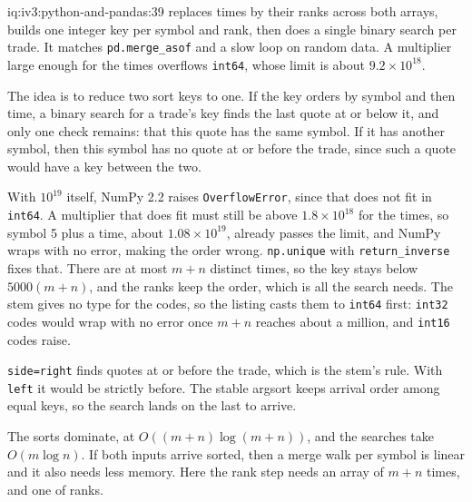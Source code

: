 \begin{solution}{iq:iv3:python-and-pandas:39}
 replaces times by their ranks across both arrays, builds one integer key per symbol and rank, then does a single binary search per trade. It matches \texttt{pd.merge\_asof} and a slow loop on random data. A multiplier large enough for the times overflows \texttt{int64}, whose limit is about $9.2 \times 10^{18}$.
\label{lst:iv3:pp:asofnp}

The idea is to reduce two sort keys to one. If the key orders by symbol and then time, a binary search for a trade's key finds the last quote at or below it, and only one check remains: that this quote has the same symbol. If it has another symbol, then this symbol has no quote at or before the trade, since such a quote would have a key between the two.

With $10^{19}$ itself, NumPy 2.2 raises \texttt{OverflowError}, since that does not fit in \texttt{int64}. A multiplier that does fit must still be above $1.8 \times 10^{18}$ for the times, so symbol 5 plus a time, about $1.08 \times 10^{19}$, already passes the limit, and NumPy wraps with no error, making the order wrong. \texttt{np.unique} with \texttt{return\_inverse} fixes that. There are at most $m + n$ distinct times, so the key stays below $5000 (m + n)$, and the ranks keep the order, which is all the search needs. The stem gives no type for the codes, so the listing casts them to \texttt{int64} first: \texttt{int32} codes would wrap with no error once $m + n$ reaches about a million, and \texttt{int16} codes raise.

\texttt{side=\textquotesingle right\textquotesingle} finds quotes at or before the trade, which is the stem's rule. With \texttt{left} it would be strictly before. The stable argsort keeps arrival order among equal keys, so the search lands on the last to arrive.

The sorts dominate, at $O((m + n) \log (m + n))$, and the searches take $O(m \log n)$. If both inputs arrive sorted, then a merge walk per symbol is linear and it also needs less memory. Here the rank step needs an array of $m + n$ times, and one of ranks.

\end{solution}

